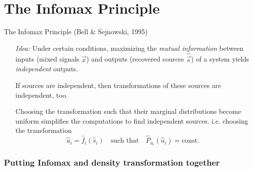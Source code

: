 
\section{The Infomax Principle}


\begin{frame}{The Infomax Principle (Bell \& Sejnowski, 1995)}

\begin{itemize}
\item[\emph{Idea:}] Under certain conditions, maximizing the
  \emph{mutual information} between inputs (mixed signals $\vec x$) and outputs
  (recovered sources $\widehat{\vec s}$) of a system yields \emph{independent} outputs.\\
  
  \svspace{5mm}
  
\item[]
  If sources are independent, then
  transformations of these sources are independent, too.\\
  
  \svspace{5mm}
  
\item[]  
  Choosing the transformation such that their marginal distributions become uniform 
  simplifies the computations to find independent sources. i.e. choosing the transformation \\
  
\begin{equation}
\widehat{u}_i = \widehat{f}_i(\widehat{s}_i)
\quad \text{such that} \quad
\widehat{P}_{u_i}(\widehat{u}_i) = \mathrm{const.}
\label{eq:transfconst}
\end{equation}

\end{itemize}

\end{frame}

\subsubsection{Putting Infomax and density transformation together}

